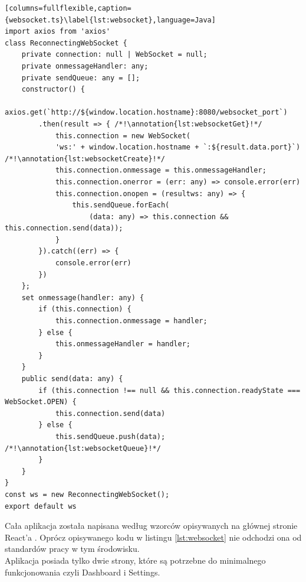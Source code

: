 \begin{lstlisting}[columns=fullflexible,caption={websocket.ts}\label{lst:websocket},language=Java]
import axios from 'axios'
class ReconnectingWebSocket {
    private connection: null | WebSocket = null;
    private onmessageHandler: any;
    private sendQueue: any = [];
    constructor() {
        axios.get(`http://${window.location.hostname}:8080/websocket_port`)
        .then(result => { /*!\annotation{lst:websocketGet}!*/
            this.connection = new WebSocket(
            'ws:' + window.location.hostname + `:${result.data.port}`) /*!\annotation{lst:websocketCreate}!*/
            this.connection.onmessage = this.onmessageHandler;
            this.connection.onerror = (err: any) => console.error(err)
            this.connection.onopen = (resultws: any) => {
                this.sendQueue.forEach(
                    (data: any) => this.connection && this.connection.send(data));
            }
        }).catch((err) => {
            console.error(err)
        })
    };
    set onmessage(handler: any) {
        if (this.connection) {
            this.connection.onmessage = handler;
        } else {
            this.onmessageHandler = handler;
        }
    }
    public send(data: any) {
        if (this.connection !== null && this.connection.readyState === WebSocket.OPEN) {
            this.connection.send(data)
        } else {
            this.sendQueue.push(data); /*!\annotation{lst:websocketQueue}!*/
        }
    }
}
const ws = new ReconnectingWebSocket();
export default ws
\end{lstlisting} \newpage
\par Cała aplikacja została napisana według wzorców opisywanych na głównej stronie React'a  \cite{React}. Oprócz opisywanego kodu w listingu \ref{lst:websocket} nie odchodzi ona od standardów pracy w tym środowisku.\\
Aplikacja posiada tylko dwie strony, które są potrzebne do minimalnego funkcjonowania czyli Dashboard i Settings.
